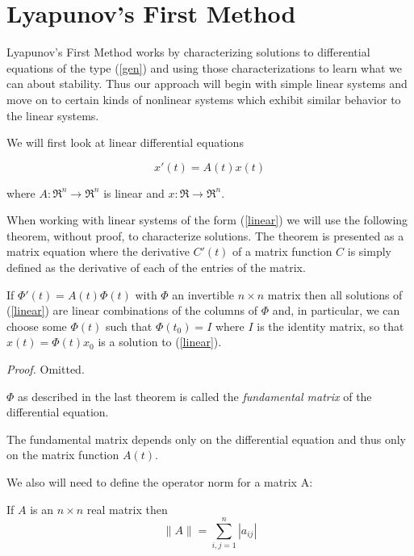 \documentclass[12pt]{article}
\def\pf{{\em Proof. }}
\begin{document}
\section {Lyapunov's First Method}

Lyapunov's First Method works by characterizing solutions to
differential equations of the type (\ref{gen}) and using those
characterizations to learn what we can about stability.  Thus our
approach will begin with simple linear systems and move on to certain
kinds of nonlinear systems which exhibit similar behavior to the
linear systems.

We will first look at linear differential equations 

\begin{equation}
	x'(t) = A(t)x(t)
    \label{linear}
\end{equation}

where $A: \Re ^n \rightarrow \Re ^n$ is linear and $x: \Re \rightarrow \Re^n.$

When working with linear systems of the form (\ref{linear}) we will
use the following theorem, without proof, to characterize solutions.
The theorem is presented as a matrix equation where the derivative
$C'(t)$ of a matrix function $C$ is simply defined as the derivative
of each of the entries of the matrix.

\begin{thm}
	If $\Phi '(t) = A(t) \Phi (t)$ with $\Phi$ an invertible $n \times
n$ matrix then all solutions of (\ref{linear}) are linear combinations
of the columns of $\Phi$ and, in particular, we can choose some $\Phi
(t)$ such that $\Phi (t_0) = I$ where $I$ is the identity matrix, so
that $x(t) = \Phi (t) x_0$ is a solution to (\ref{linear}).  \end{thm}

\pf Omitted.

\begin{dfn}
	$\Phi$ as described in the last theorem is called the {\em
fundamental matrix} of the differential equation.
\end{dfn}

The fundamental matrix depends only on the differential equation and
thus only on the matrix function $A(t)$.

We also will need to define the operator norm for a matrix A:

\begin{dfn}
	If $A$ is an $n \times n$ real matrix then
$$\| A \| = \sum^n_{i,j=1} |a_{ij}|$$
\end{dfn}
\end{document}
